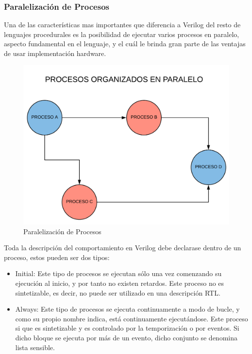 \subsubsection{Paralelización de Procesos}
Una de las características mas importantes que diferencia a Verilog del resto de lenguajes procedurales es la posibilidad de ejecutar varios procesos en paralelo, aspecto fundamental en el lenguaje, y el cuál le brinda gran parte de las ventajas de usar implementación hardware.

\begin{center}
	\begin{figure}[H]
		\center
		\includegraphics[trim = 0mm 0mm 0mm 0mm, clip,scale=0.3]{imagenes/EstadoArte/procesos_paralelo.pdf}
		\caption{Paralelización de Procesos}
		\label{fig:procesos_paralelo}
	\end{figure}
	
\end{center}
Toda la descripción del comportamiento en Verilog debe declarase dentro de un proceso, estos pueden ser dos tipos:

\begin{itemize}
		\item Initial: Este tipo de procesos se ejecutan sólo una vez comenzando su ejecución al inicio, y por tanto no existen retardos. Este proceso no es sintetizable, es decir, no puede ser utilizado en una descripción RTL.
		
		\item Always: Este tipo de procesos se ejecuta continuamente a modo de bucle, y como su propio nombre indica, está continuamente ejecutándose. Este proceso si que es sintetizable y es controlado por la temporización o por eventos. Si dicho bloque se ejecuta por más de un evento, dicho conjunto se denomina lista sensible.
\end{itemize}

